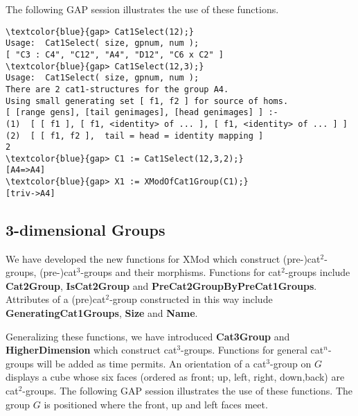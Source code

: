 \documentclass[a4paper,11pt]{article}
\theoremstyle{plain}
\theoremstyle{definition}
\begin{document}
The following \textsf{GAP} session illustrates the use of these functions.

\begin{Verbatim}[frame=single, fontsize=\small, commandchars=\\\{\}]
\textcolor{blue}{gap> Cat1Select(12);}
Usage:  Cat1Select( size, gpnum, num );
[ "C3 : C4", "C12", "A4", "D12", "C6 x C2" ]
\textcolor{blue}{gap> Cat1Select(12,3);}
Usage:  Cat1Select( size, gpnum, num );
There are 2 cat1-structures for the group A4.
Using small generating set [ f1, f2 ] for source of homs.
[ [range gens], [tail genimages], [head genimages] ] :-
(1)  [ [ f1 ], [ f1, <identity> of ... ], [ f1, <identity> of ... ] ]
(2)  [ [ f1, f2 ],  tail = head = identity mapping ]
2
\textcolor{blue}{gap> C1 := Cat1Select(12,3,2);}
[A4=>A4]
\textcolor{blue}{gap> X1 := XModOfCat1Group(C1);}
[triv->A4]
\end{Verbatim}

\subsection{3-dimensional Groups}

We have developed the new functions for \textsf{XMod} which construct 
(pre-)cat$^{2}$-groups, (pre-)cat$^{3}$-groups and their morphisms. 
Functions for cat$^{2} $-groups include \textbf{Cat2Group}, 
\textbf{IsCat2Group} and \textbf{PreCat2GroupByPreCat1Groups}. 
Attributes of a (pre)cat$^{2}$-group constructed in this way include 
\textbf{GeneratingCat1Groups}, \textbf{Size} and \textbf{Name}. 

Generalizing these functions, we have introduced \textbf{Cat3Group} and \textbf{HigherDimension} which construct cat$^{3}$-groups. 
Functions for general cat$^{n}$-groups will be added as time permits. 
An orientation of a cat$^{3}$-group on $G$ displays a cube whose six faces 
(ordered as front; up, left, right, down,back) are cat$^{2}$-groups. 
The following \textsf{GAP} session illustrates the use of these functions. 
The group $G$ is positioned where the front, up and left faces meet. 
\end{document}

